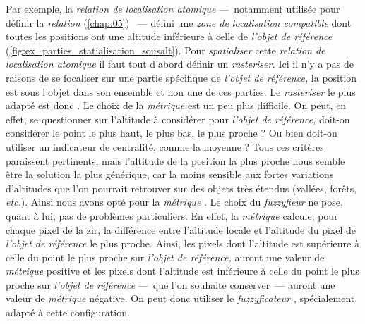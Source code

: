 %   

Par exemple, la \emph{relation de localisation atomique}
 ---~notamment utilisée pour définir
la \emph{relation}  (\autoref{chap:05})
~--- défini une \emph{zone de localisation compatible} dont
toutes les positions ont une altitude inférieure à celle de
\emph{l'objet de référence}
(\autoref{fig:ex_parties_statialisation_sousalt}). Pour
\emph{spatialiser} cette \emph{relation de localisation atomique} il
faut tout d'abord définir un \emph{rasteriser.} Ici il n'y a pas de
raisons de se focaliser sur une partie spécifique de \emph{l'objet de
  référence,} la position est sous l'objet dans son ensemble et non
une de ces parties. Le \emph{rasteriser} le plus adapté est donc
. Le choix de la \emph{métrique} est un peu plus
difficile. On peut, en effet, se questionner sur l'altitude à
considérer pour \emph{l'objet de référence,} doit-on considérer le
point le plus haut, le plus bas, le plus proche ? Ou bien doit-on
utiliser un indicateur de centralité, comme la moyenne ? Tous ces
critères paraissent pertinents, mais l'altitude de la position la plus
proche nous semble être la solution la plus générique, car la moins
sensible aux fortes variations d'altitudes que l'on pourrait retrouver
sur des objets très étendus (\eg vallées, forêts, \emph{etc.}). Ainsi
nous avons opté pour la \emph{métrique}
. Le choix du \emph{fuzzyfieur} ne
pose, quant à lui, pas de problèmes particuliers. En effet, la
\emph{métrique}  calcule, pour chaque
pixel de la \ac{zir}, la différence entre l'altitude locale et
l'altitude du pixel de \emph{l'objet de référence} le plus
proche. Ainsi, les pixels dont l'altitude est supérieure à celle du
point le plus proche sur \emph{l'objet de référence,} auront une
valeur de \emph{métrique} positive et les pixels dont l'altitude est
inférieure à celle du point le plus proche sur \emph{l'objet de
  référence} ---~que l'on souhaite conserver~--- auront une valeur de
\emph{métrique} négative. On peut donc utiliser le
\emph{fuzzyficateur} , spécialement adapté à
cette configuration.

